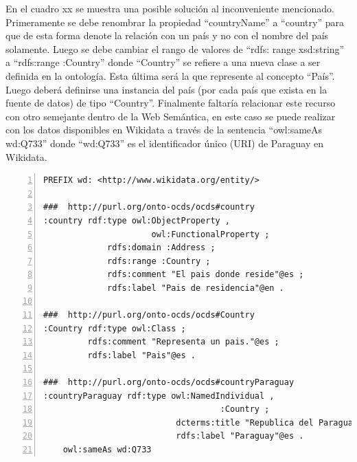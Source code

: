  En el cuadro xx se muestra una posible solución al inconveniente mencionado. Primeramente se debe renombrar la propiedad “countryName” a “country” para que de esta forma denote la relación con un país y no con el nombre del país solamente. Luego se debe cambiar el rango de valores de “rdfs: range xsd:string” a “rdfs:range :Country” donde “Country” se refiere a una nueva clase a ser definida en la ontología. Esta última será la que represente al concepto “País”. Luego deberá definirse una instancia del país (por cada país que exista en la fuente de datos) de tipo “Country”. Finalmente faltaría relacionar este recurso con otro semejante dentro de la Web Semántica, en este caso se puede realizar con los datos disponibles en Wikidata a través de la sentencia “owl:sameAs wd:Q733” donde “wd:Q733” es el identificador único (URI) de Paraguay en Wikidata.

 \begin{lstlisting}[captionpos=b, caption=Información referente al proceso licitatorio cuyo identificacor es, label=lst:caso1,  numbers=left,  numberstyle=\tiny\color{mygray},
    basicstyle=\small,frame=single]
PREFIX wd: <http://www.wikidata.org/entity/>

###  http://purl.org/onto-ocds/ocds#country
:country rdf:type owl:ObjectProperty ,
                      owl:FunctionalProperty ;
             rdfs:domain :Address ;
             rdfs:range :Country ;
             rdfs:comment "El pais donde reside"@es ;
             rdfs:label "Pais de residencia"@en .

###  http://purl.org/onto-ocds/ocds#Country
:Country rdf:type owl:Class ;
         rdfs:comment "Representa un pais."@es ;
         rdfs:label "Pais"@es .

###  http://purl.org/onto-ocds/ocds#countryParaguay
:countryParaguay rdf:type owl:NamedIndividual ,
                                    :Country ;
                           dcterms:title "Republica del Paraguay"@es ;
                           rdfs:label "Paraguay"@es .
    owl:sameAs wd:Q733
 \end{lstlisting}


